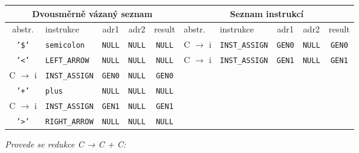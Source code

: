 \documentclass[12pt,a4paper,titlepage,final]{article}
\begin{document}
    \begin{small}
      \noindent
      \begin{tabular}{|c|l|c|c|c||l|l|c|c|c|}

        \multicolumn{5}{c}{Dvousměrně vázaný seznam} &
        \multicolumn{5}{c}{Seznam instrukcí} \\

        \hline
        abstr. & instrukce & adr1 & adr2 & result &
        abstr. & instrukce & adr1 & adr2 & result \\

        \hline

        \texttt{'\$'} & \texttt{semicolon} & \texttt{NULL} &
        \texttt{NULL} & \texttt{NULL} &C $\rightarrow$ i &
        \texttt{INST\_ASSIGN} & \texttt{GEN0} & \texttt{NULL} &
        \texttt{GEN0} \\

        \texttt{'<'} & \texttt{LEFT\_ARROW} & \texttt{NULL} &
        \texttt{NULL} & \texttt{NULL} & C $\rightarrow$ i &
        \texttt{INST\_ASSIGN} & \texttt{GEN1} & \texttt{NULL} &
        \texttt{GEN1} \\

        C $\rightarrow$ i & \texttt{INST\_ASSIGN} & \texttt{GEN0} &
        \texttt{NULL} & \texttt{GEN0} & & & & & \\

        \texttt{'+'} & \texttt{plus} & \texttt{NULL} & \texttt{NULL} &
        \texttt{NULL} & & & & & \\

        C $\rightarrow$ i & \texttt{INST\_ASSIGN} & \texttt{GEN1} &
        \texttt{NULL} & \texttt{GEN1} & & & & & \\

        \texttt{'>'} & \texttt{RIGHT\_ARROW} & \texttt{NULL} & \texttt{NULL} &
        \texttt{NULL} & & & & &  \\

        \hline

      \end{tabular}
    \end{small}

    \noindent
    \textit{Provede se redukce C → C + C:}
\end{document}
